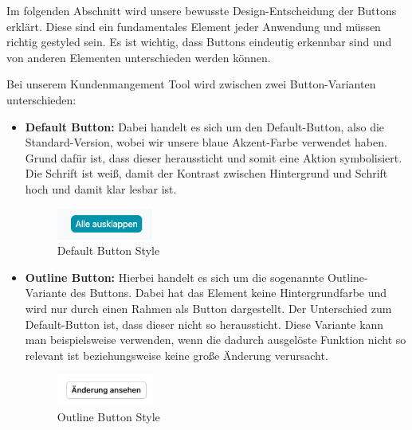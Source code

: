 Im folgenden Abschnitt wird unsere bewusste Design-Entscheidung der Buttons erklärt. Diese sind ein fundamentales Element jeder Anwendung und müssen richtig gestyled sein. Es ist wichtig, dass Buttons eindeutig erkennbar sind und von anderen Elementen unterschieden werden können.

Bei unserem Kundenmangement Tool wird zwischen zwei Button-Varianten unterschieden:

\begin{itemize}
    \item \textbf{Default Button:}
        \newline
        Dabei handelt es sich um den Default-Button, also die Standard-Version, wobei wir unsere blaue Akzent-Farbe verwendet haben. Grund dafür ist, dass dieser heraussticht und somit eine Aktion symbolisiert. Die Schrift ist weiß, damit der Kontrast zwischen Hintergrund und Schrift hoch und damit klar lesbar ist.
        \begin{figure}[h!]
            \centering
            \includegraphics[width=0.3\textwidth]{pics/button-default.png}
            \caption{Default Button Style}
            \label{fig:mesh1}
        \end{figure}
    \item \textbf{Outline Button:}
        \newline
        Hierbei handelt es sich um die sogenannte Outline-Variante des Buttons. Dabei hat das Element keine Hintergrundfarbe und wird nur durch einen Rahmen als Button dargestellt. Der Unterschied zum Default-Button ist, dass dieser nicht so heraussticht. Diese Variante kann man beispielsweise verwenden, wenn die dadurch ausgelöste Funktion nicht so relevant ist beziehungsweise keine große Änderung verursacht.
        \begin{figure}[h!]
            \centering
            \includegraphics[width=0.3\textwidth]{pics/button-outline.png}
            \caption{Outline Button Style}
            \label{fig:mesh1}
        \end{figure}
\end{itemize}
